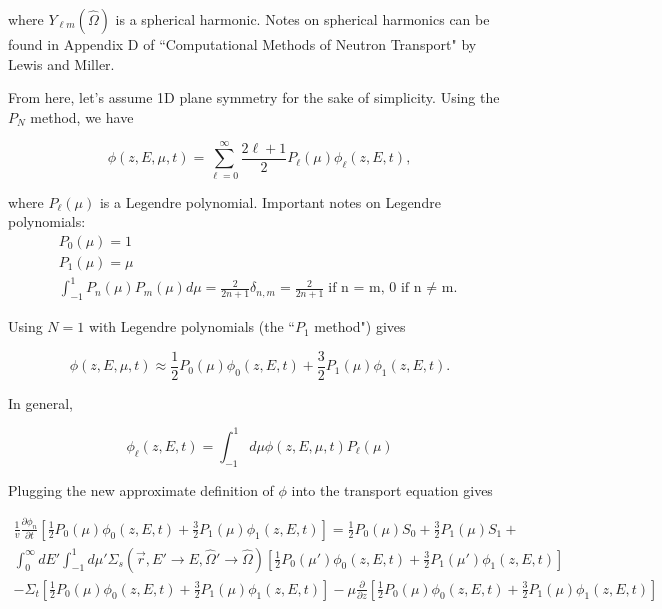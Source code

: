 \documentclass[12pt]{article}
\newcommand{\rvec}{\ensuremath{\vec{r}}}
\newcommand{\omvec}{\ensuremath{\hat{\Omega}}}
\newcommand{\sigs}{\ensuremath{\Sigma_s(\rvec,E'\rightarrow E,\omvec'\rightarrow\omvec)}}
\newcommand{\el}{\ensuremath{\ell}}
\begin{document}
where $Y_{\el m}(\omvec)$ is a spherical harmonic. Notes on spherical harmonics can be found in Appendix D
of ``Computational Methods of Neutron Transport" by Lewis and Miller.


From here, let's assume 1D plane symmetry for the sake of simplicity. Using the $P_N$ method, we have

\begin{equation*}
\phi(z,E,\mu,t) = \sum_{\el=0}^{\infty}\frac{2\el+1}{2}P_{\el}(\mu)\phi_{\el}(z,E,t),
\end{equation*}

where $P_{\ell}(\mu)$ is a Legendre polynomial. Important notes on Legendre polynomials:
\begin{gather*}
P_0(\mu) = 1 \\
P_1(\mu) = \mu \\
\int_{-1}^{1}P_n(\mu)P_m(\mu)d\mu = 
\frac{2}{2n+1}\delta_{n,m}=\frac{2}{2n+1}\text{if n = m, 0 if n $\neq$ m.}
\end{gather*}

Using $N=1$ with Legendre polynomials (the ``$P_1$ method") gives

\begin{equation*}
\phi(z,E,\mu,t) \approx \frac{1}{2}P_0(\mu)\phi_0(z,E,t) + \frac{3}{2}P_1(\mu)\phi_1(z,E,t).
\end{equation*}

In general, 

\begin{equation*}
\phi_{\el}(z,E,t) = \int^{1}_{-1}d\mu\phi(z,E,\mu,t)P_{\el}(\mu) 
\end{equation*}

Plugging the new approximate definition of $\phi$ into the transport equation gives

\begin{multline*}
\frac{1}{v}\frac{\partial\phi_n}{\partial t}\left[\frac{1}{2}P_0(\mu)\phi_0(z,E,t) + \frac{3}{2}P_1(\mu)\phi_1(z,E,t)\right] = 
\frac{1}{2}P_0(\mu)S_0 + \frac{3}{2}P_1(\mu)S_1 + \\ 
\int^{\infty}_{0}dE'\int^{1}_{-1}d\mu'\sigs\left[\frac{1}{2}P_0(\mu')\phi_0(z,E,t) + \frac{3}{2}P_1(\mu')\phi_1(z,E,t)\right] \\
- \Sigma_t\left[\frac{1}{2}P_0(\mu)\phi_0(z,E,t) + \frac{3}{2}P_1(\mu)\phi_1(z,E,t)\right]
- \mu\frac{\partial}{\partial z}\left[\frac{1}{2}P_0(\mu)\phi_0(z,E,t) + \frac{3}{2}P_1(\mu)\phi_1(z,E,t)\right]
\end{multline*}
\end{document}
